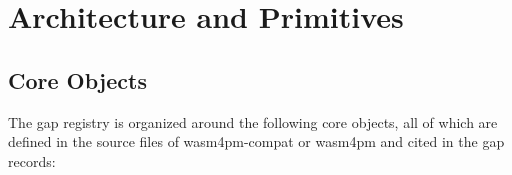 
\section{Architecture and Primitives}
\label{sec:gaps-architecture}

\subsection{Core Objects}
\label{sec:gaps-architecture-objects}

The gap registry is organized around the following core objects, all of which are
defined in the source files of wasm4pm-compat or wasm4pm and cited in the gap records:

